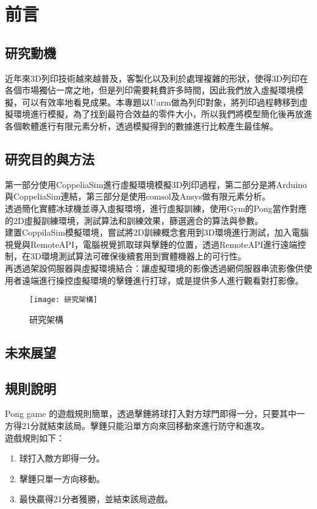 \chapter{前言}
\renewcommand{\baselinestretch}{10.0} %
\setcounter{page}{1}  %
\fontsize{14pt}{2.5pt}\sectionef
\section{研究動機}
近年來3D列印技術越來越普及，客製化以及利於處理複雜的形狀，使得3D列印在各個市場獨佔一席之地，但是列印需要耗費許多時間，因此我們放入虛擬環境模擬，可以有效率地看見成果。本專題以Uarm做為列印對象，將列印過程轉移到虛擬環境進行模擬，為了找到最符合效益的零件大小，所以我們將模型簡化後再放進各個軟體進行有限元素分析，透過模擬得到的數據進行比較產生最佳解。\\

\section{研究目的與方法}
第一部分使用CoppeliaSim進行虛擬環境模擬3D列印過程，第二部分是將Arduino與CoppeliaSim連結，第三部分是使用comsol及Ansys做有限元素分析。\\

透過簡化實體冰球機並導入虛擬環境，進行虛擬訓練，使用Gym的Pong當作對應的2D虛擬訓練環境，測試算法和訓練效果，篩選適合的算法與參數。\\

建置CoppilaSim模擬環境，嘗試將2D訓練概念套用到3D環境進行測試，加入電腦視覺與RemoteAPI，電腦視覺抓取球與擊錘的位置，透過RemoteAPI進行遠端控制，在3D環境測試算法可確保後續套用到實體機器上的可行性。\\
 
 再透過架設伺服器與虛擬環境結合：讓虛擬環境的影像透過網伺服器串流影像供使用者遠端進行操控虛擬環境的擊錘進行打球，或是提供多人進行觀看對打影像。
\begin{figure}[hbt!]
\begin{center}
\texttt{[image: 研究架構]}
\caption{\Large 研究架構 }
\label{研究架構 }
\end{center}
\end{figure}
\section{未來展望}

\section{規則說明}
 Pong game 的遊戲規則簡單，透過擊錘將球打入對方球門即得一分，只要其中一方得21分就結束該局。擊錘只能沿單方向來回移動來進行防守和進攻。\\
遊戲規則如下：
\begin{enumerate}
\item 球打入敵方即得一分。
\item 擊錘只單一方向移動。
\item 最快贏得21分者獲勝，並結束該局遊戲。
\end{enumerate}

\renewcommand{\baselinestretch}{0.5} %